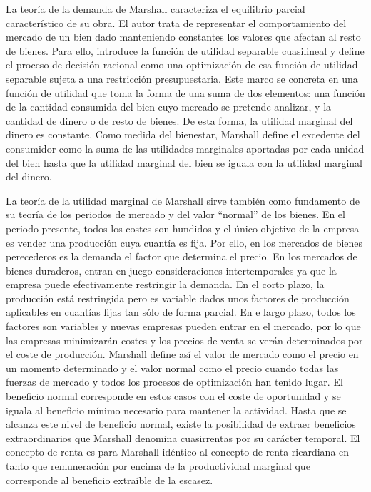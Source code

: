 \documentclass{nuevotema}
\begin{document}
La teoría de la demanda de Marshall caracteriza el equilibrio parcial característico de su obra. El autor trata de representar el comportamiento del mercado de un bien dado manteniendo constantes los valores que afectan al resto de bienes. Para ello, introduce la función de utilidad separable cuasilineal y define el proceso de decisión racional como una optimización de esa función de utilidad separable sujeta a una restricción presupuestaria. Este marco se concreta en una función de utilidad que toma la forma de una suma de dos elementos: una función de la cantidad consumida del bien cuyo mercado se pretende analizar, y la cantidad de dinero o de resto de bienes. De esta forma, la utilidad marginal del dinero es constante. Como medida del bienestar, Marshall define el excedente del consumidor como la suma de las utilidades marginales aportadas por cada unidad del bien hasta que la utilidad marginal del bien se iguala con la utilidad marginal del dinero. 

La teoría de la utilidad marginal de Marshall sirve también como fundamento de su teoría de los periodos de mercado y del valor ``normal'' de los bienes. En el periodo presente, todos los costes son hundidos y el único objetivo de la empresa es vender una producción cuya cuantía es fija. Por ello, en los mercados de bienes perecederos es la demanda el factor que determina el precio. En los mercados de bienes duraderos, entran en juego consideraciones intertemporales ya que la empresa puede efectivamente restringir la demanda. En el corto plazo, la producción está restringida pero es variable dados unos factores de producción aplicables en cuantías fijas tan sólo de forma parcial. En e largo plazo, todos los factores son variables y nuevas empresas pueden entrar en el mercado, por lo que las empresas minimizarán costes y los precios de venta se verán determinados por el coste de producción. Marshall define así el valor de mercado como el precio en un momento determinado y el valor normal como el precio cuando todas las fuerzas de mercado y todos los procesos de optimización han tenido lugar. El beneficio normal corresponde en estos casos con el coste de oportunidad y se iguala al beneficio mínimo necesario para mantener la actividad. Hasta que se alcanza este nivel de beneficio normal, existe la posibilidad de extraer beneficios extraordinarios que Marshall denomina cuasirrentas por su carácter temporal. El concepto de renta es para Marshall idéntico al concepto de renta ricardiana en tanto que remuneración por encima de la productividad marginal que corresponde al beneficio extraíble de la escasez. 
\end{document}
